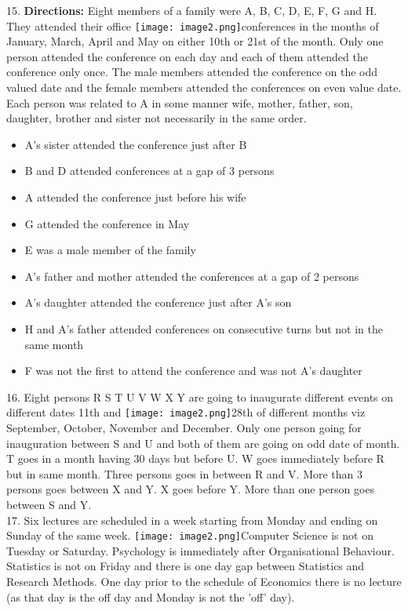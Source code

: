 \documentclass[
]{article}
\begin{document}
15. \textbf{Directions:} Eight members of a family were A, B, C, D, E, F, G and H. They attended their
office \texttt{[image: image2.png]}conferences in the months of January, March, April and May on either 10th or 21st of
the month. Only one person attended the conference on each day and each of them attended
the conference only once. The male members attended the conference on the odd valued
date and the female members attended the conferences on even value date. Each person was
related to A in some manner wife, mother, father, son, daughter, brother and sister not
necessarily in the same order.\\
\begin{itemize}
    \item A’s sister attended the conference just after B
\item B and D attended conferences at a gap of 3 persons
\item A attended the conference just before his wife
\item G attended the conference in May
\item E was a male member of the family
\item A’s father and mother attended the conferences at a gap of 2 persons
\item A’s daughter attended the conference just after A’s son
\item H and A’s father attended conferences on consecutive turns but not in the same month
\item F was not the first to attend the conference and was not A’s daughter
\end{itemize}

16. Eight persons R S T U V W X Y are going to inaugurate different events on different dates
11th and \texttt{[image: image2.png]}28th of different months viz September, October, November and December. Only
one person going for inauguration between S and U and both of them are going on odd date
of month. T goes in a month having 30 days but before U. W goes immediately before R but
in same month. Three persons goes in between R and V. More than 3 persons goes between
X and Y. X goes before Y. More than one person goes between S and Y.\\

17. Six lectures are scheduled in a week starting from Monday and ending on Sunday of the
same week. \texttt{[image: image2.png]}Computer Science is not on Tuesday or Saturday. Psychology is immediately
after Organisational Behaviour. Statistics is not on Friday and there is one day gap between
Statistics and Research Methods. One day prior to the schedule of Economics there is no
lecture (as that day is the off day and Monday is not the ’off’ day).\\
\end{document}
